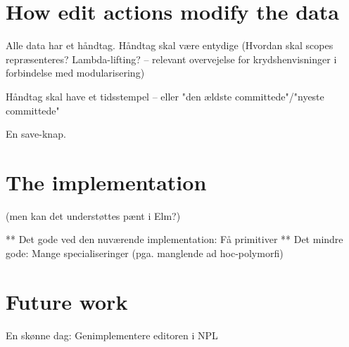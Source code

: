 \documentclass{article}
\begin{document}
\section{How edit actions modify the data}

Alle data har et håndtag. Håndtag skal være entydige (Hvordan skal scopes repræsenteres? Lambda-lifting? -- relevant overvejelse for krydshenvisninger i forbindelse med modularisering)

Håndtag skal have et tidsstempel – eller "den ældste committede"/"nyeste committede"

En save-knap.

\section{The implementation}

(men kan det understøttes pænt i Elm?)

** Det gode ved den nuværende implementation: Få primitiver
** Det mindre gode: Mange specialiseringer (pga. manglende ad hoc-polymorfi)


\section{Future work}

En skønne dag: Genimplementere editoren i NPL
\end{document}
